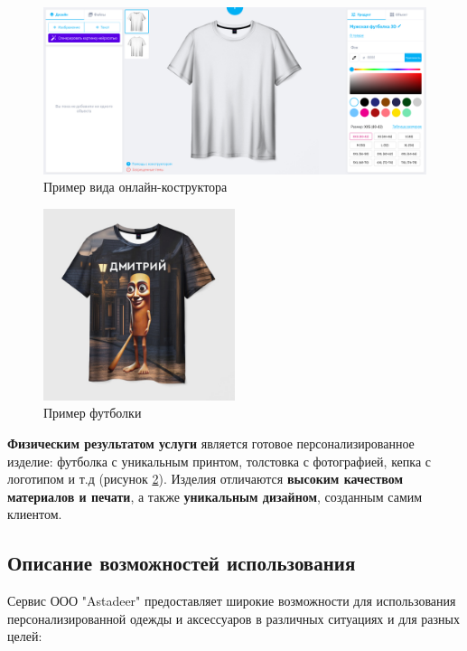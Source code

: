 \begin{figure}
    \centering
    \includegraphics[width=\textwidth]{img/editor.png}
    \caption{Пример вида онлайн-коструктора}
    \label{fig:editor}
\end{figure}

\begin{figure}
    \centering
    \includegraphics[width=0.5\textwidth]{img/tshirt.png}
    \caption{Пример футболки}
    \label{fig:tshirt}
\end{figure}

\vspace{0.3cm}

\textbf{Физическим результатом услуги} является готовое персонализированное изделие: футболка с уникальным принтом, толстовка с фотографией, кепка с логотипом и т.д (рисунок \ref{fig:tshirt}).  Изделия отличаются \textbf{высоким качеством материалов и печати}, а также \textbf{уникальным дизайном}, созданным самим клиентом.

\subsection{Описание возможностей использования}

Сервис ООО "Astadeer" предоставляет широкие возможности для использования персонализированной одежды и аксессуаров в различных ситуациях и для разных целей:

